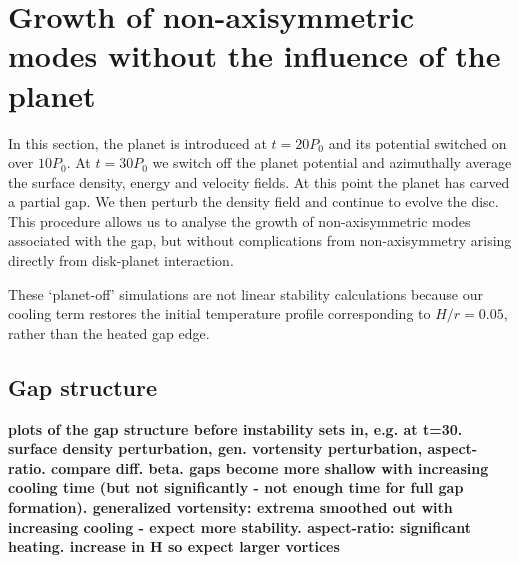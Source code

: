 \section{Growth of non-axisymmetric modes without the influence of the
  planet}
In this section, the planet is introduced at $t=20P_0$ and 
its potential switched on over $10P_0$. At $t=30P_0$ we switch off the
planet potential and azimuthally average the surface density, energy
and velocity fields. At this point the planet has carved a partial
gap. We then perturb the density field and continue to 
evolve the disc. This procedure allows us to analyse the growth of
non-axisymmetric modes associated with the gap, but without
complications from non-axisymmetry arising directly from disk-planet
interaction.   

These `planet-off' simulations are not linear stability calculations
because our cooling term restores the initial temperature profile
corresponding to $H/r=0.05$, rather than the heated gap edge.   





\subsection{Gap structure}
{\bf plots of the gap structure before instability sets in, e.g. at
  t=30. surface density perturbation, gen. vortensity perturbation,
  aspect-ratio. compare diff. beta. gaps become more shallow with
  increasing cooling time (but not significantly - not enough time for
  full gap formation). generalized vortensity: extrema smoothed out
  with increasing cooling - expect more stability. aspect-ratio:
  significant heating. increase in H so expect larger vortices
}

